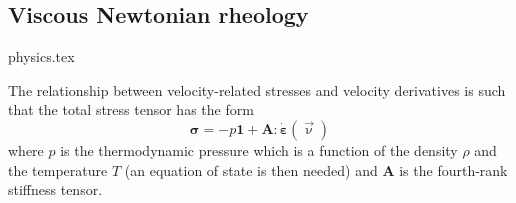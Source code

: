 \subsection{Viscous Newtonian rheology}
\begin{flushright} {\tiny {\color{gray} physics.tex}} \end{flushright}

The relationship between velocity-related stresses and
velocity derivatives is such that the total stress tensor has the form \cite{berc09}
\begin{equation}
{\bm \sigma} = -p {\bm 1} + {\bm A}:\dot{\bm \varepsilon}(\vec\upnu)
\end{equation}
where $p$ is the thermodynamic pressure which is a function of the density $\rho$ and the temperature $T$ (an equation of state is then needed)
and ${\bm A}$ is the fourth-rank stiffness tensor.

